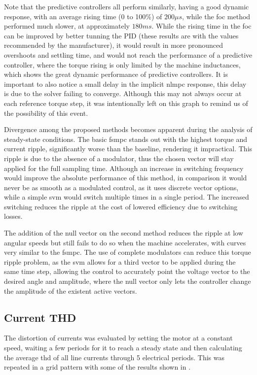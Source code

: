 Note that the predictive controllers all perform similarly, having a good dynamic response, with an average rising time (0 to 100\%) of $200\mu s$, while the \gls{foc} method performed much slower, at approximately $180ms$. While the rising time in the \gls{foc} can be improved by better tunning the PID (these results are with the values recommended by the manufacturer), it would result in more pronounced overshoots and settling time, and would not reach the performance of a predictive controller, where the torque rising is only limited by the machine inductances, which shows the great dynamic performance of predictive controllers. It is important to also notice a small delay in the implicit \gls{nlmpc} response, this delay is due to the solver failing to converge. Although this may not always occur at each reference torque step, it was intentionally left on this graph to remind us of the possibility of this event. 

Divergence among the proposed methods becomes apparent during the analysis of steady-state conditions. The basic \gls{fsmpc} stands out with the highest torque and current ripple, significantly worse than the baseline, rendering it impractical. This ripple is due to the absence of a modulator, thus the chosen vector will stay applied for the full sampling time. Although an increase in switching frequency would improve the absolute performance of this method, in comparison it would never be as smooth as a modulated control, as it uses discrete vector options, while a simple \gls{svm} would switch multiple times in a single period. The increased switching reduces the ripple at the cost of lowered efficiency due to switching losses.

The addition of the null vector on the second method reduces the ripple at low angular speeds but still fails to do so when the machine accelerates, with curves very similar to the \gls{fsmpc}. The use of complete modulators can reduce this torque ripple problem, as the \gls{svm} allows for a third vector to be applied during the same time step, allowing the control to accurately point the voltage vector to the desired angle and amplitude, where the null vector only lets the controller change the amplitude of the existent active vectors.
\subsection{Current THD}

The distortion of currents was evaluated by setting the motor at a constant speed, waiting a few periods for it to reach a steady state and then calculating the average \gls{thd} of all line currents through 5 electrical periods. This was repeated in a grid pattern with some of the results shown in .

